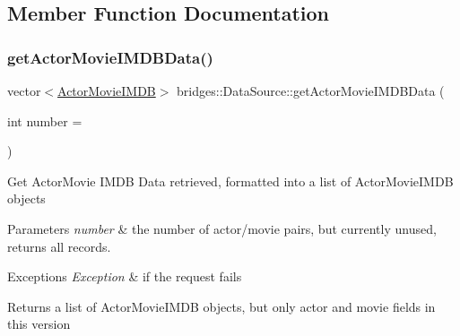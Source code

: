 \subsection{Member Function Documentation}
\mbox{\label{classbridges_1_1_data_source_a664694136550312ab3f5a82bebb91bca}} 
\subsubsection{\texorpdfstring{get\+Actor\+Movie\+I\+M\+D\+B\+Data()}{getActorMovieIMDBData()}}
{\footnotesize\ttfamily vector$<$\mbox{\hyperlink{classbridges_1_1dataset_1_1_actor_movie_i_m_d_b}{Actor\+Movie\+I\+M\+DB}}$>$ bridges\+::\+Data\+Source\+::get\+Actor\+Movie\+I\+M\+D\+B\+Data (\begin{DoxyParamCaption}\item[{int}]{number = {} }\end{DoxyParamCaption})\hspace{0.3cm}{\ttfamily [inline]}}

Get Actor\+Movie I\+M\+DB Data retrieved, formatted into a list of Actor\+Movie\+I\+M\+DB objects


\begin{DoxyParams}{Parameters}
{\em number} & the number of actor/movie pairs, but currently unused, returns all records. \\
\hline
\end{DoxyParams}

\begin{DoxyExceptions}{Exceptions}
{\em Exception} & if the request fails\\
\hline
\end{DoxyExceptions}
\begin{DoxyReturn}{Returns}
a list of Actor\+Movie\+I\+M\+DB objects, but only actor and movie fields in this version 
\end{DoxyReturn}
\mbox{\label{classbridges_1_1_data_source_a00f0a0a1871d4864c6ccdd04195e0fb2}} 
